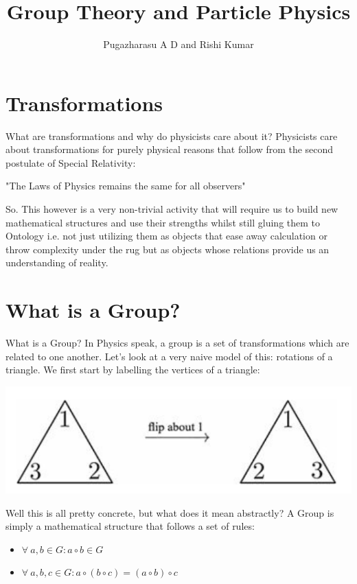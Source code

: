 \documentclass[]{article}
\title{Group Theory and Particle Physics}
\author{Pugazharasu A D and Rishi Kumar}
\begin{document}
\maketitle

\begin{abstract}

\end{abstract}
\section{Transformations}
What are transformations and why do physicists care about it? Physicists care about transformations for purely physical reasons that follow from the second postulate of Special Relativity:\\
\begin{center}
"The Laws of Physics remains the same for all observers"
\end{center}
So. This however is a very non-trivial activity that will require us to build new mathematical structures and use their strengths whilst still gluing them to Ontology i.e. not just utilizing them as objects that ease away calculation or throw complexity under the rug but as objects whose relations provide us an understanding of reality.

\section{What is a Group?}
What is a Group? In Physics speak, a group is a set of transformations which are related to one another. Let's look at a very naive model of this: rotations of a triangle. We first start by labelling the vertices of a triangle:
\begin{center}
	\includegraphics[width= 0.4\paperwidth, height= 0.07\paperheight]{1.png}
\end{center}
Well this is all pretty concrete, but what does it mean abstractly? A Group is simply a mathematical structure that follows a set of rules:
\begin{itemize}
\item $\forall \ a,b \in G: a \circ b \in G$
\item $\forall \ a,b,c \in G: a \circ (b \circ c) = (a \circ b) \circ c$	
\end{itemize}
\end{document}

